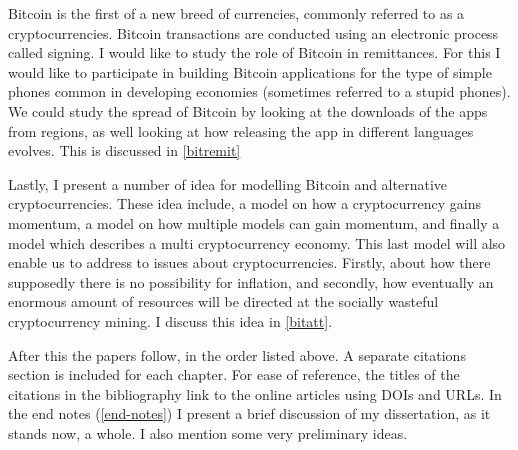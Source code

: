 \begin{refsection}
Bitcoin is the first of a new breed of currencies, commonly referred to as a cryptocurrencies. 
Bitcoin transactions are conducted using an electronic process called signing.
I would like to study the role of Bitcoin in remittances.
For this I would like to participate in building Bitcoin applications for the type of simple phones common in developing economies (sometimes referred to a stupid phones).
We could study the spread of Bitcoin by looking at the downloads of the apps from regions,
as well looking at how releasing the app in different languages evolves.
This is discussed in \autoref{bitremit}

Lastly, I present a number of idea for modelling Bitcoin and alternative cryptocurrencies.
These idea include, a model on how a cryptocurrency gains momentum,
a model on how multiple models can gain momentum,
and finally a model which describes a multi cryptocurrency economy.
This last model will also enable us to address to issues about cryptocurrencies.
Firstly, about how there supposedly there is no possibility for inflation,
and secondly, how eventually an enormous amount of resources will be directed at the socially wasteful cryptocurrency mining.
I discuss this idea in \autoref{bitatt}.

After this the papers follow, in the order listed above.
A separate citations section is included for each chapter.
For ease of reference, the titles of the citations in the bibliography link to the online articles using DOIs and URLs.
In the end notes (\autoref{end-notes}) I present a brief discussion of my dissertation, as it stands now, a whole.
I also mention some very preliminary ideas.

\printbibliography
\end{refsection}